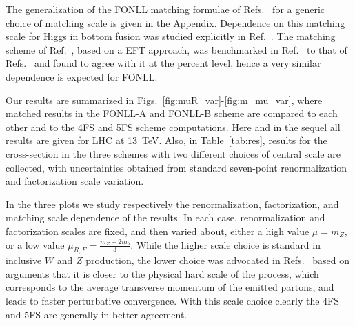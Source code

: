 \documentclass[12pt]{article}
\begin{document}
The generalization of the FONLL matching formulae of
Refs.~\cite{Forte:2015hba,Forte:2016sja} for a generic choice of
matching scale is given in the Appendix.
Dependence on this
matching scale for Higgs in bottom fusion  was studied explicitly in
Ref.~\cite{Bonvini:2015pxa,Bonvini:2016fgf}. The matching scheme of 
Ref.~\cite{Bonvini:2015pxa,Bonvini:2016fgf}, based on a EFT approach,
was benchmarked in Ref.~\cite{deFlorian:2016spz} to that of
Refs.~\cite{Forte:2015hba,Forte:2016sja} and found to agree with it at
the percent level, hence a very similar dependence is expected for
FONLL.


Our results are summarized in
Figs.~\ref{fig:muR_var}-\ref{fig:m_mu_var}, where
matched results in the FONLL-A and FONLL-B scheme are compared to each
other and to the 4FS and 5FS scheme computations. Here and in the
sequel all results are given for LHC at 13~TeV.  Also, in
Table~\ref{tab:res}, results for the cross-section in the
three schemes with two different choices of central scale are
collected, with uncertainties obtained from
standard seven-point renormalization and factorization
scale variation. 


In the three plots
we study respectively the renormalization, factorization, and matching
scale dependence of the results. 
In each
case, renormalization and factorization scales are fixed, and then
varied about, either a high value $\mu=m_Z$, or a low value
$\mu_{R,F}=\frac{m_Z+2m_b}{3}$. While the higher scale choice is standard in
inclusive $W$ and $Z$ production, the lower choice was advocated in
Refs.~\cite{Maltoni:2012pa,Lim:2016wjo} based on arguments 
that it is closer to the physical hard scale of the process, which
corresponds to the average transverse momentum of the emitted partons, 
and leads
to faster perturbative convergence. With this scale choice clearly the
4FS and 5FS are generally in better agreement.
\end{document}
